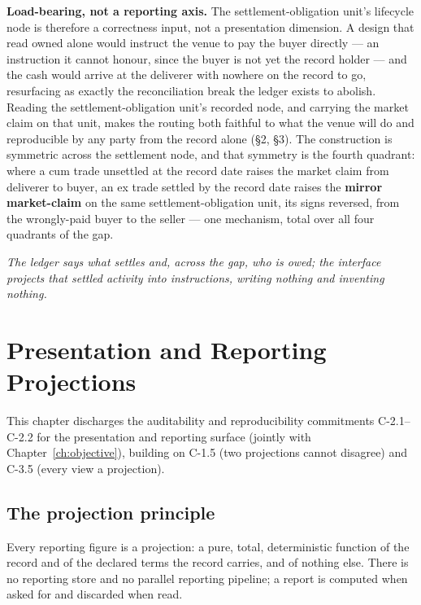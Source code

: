 \documentclass[11pt,a4paper]{article}
\begin{document}
\medskip\noindent\textbf{Load-bearing, not a reporting axis.} The settlement-obligation
unit's lifecycle node is therefore a correctness input, not a presentation dimension. A
design that read owned alone would instruct the venue to pay the buyer directly --- an
instruction it cannot honour, since the buyer is not yet the record holder --- and the
cash would arrive at the deliverer with nowhere on the record to go, resurfacing as
exactly the reconciliation break the ledger exists to abolish. Reading the
settlement-obligation unit's recorded node, and carrying the market claim on that unit,
makes the routing both faithful to what the venue will do and reproducible by any party
from the record alone (\S2, \S3). The construction is symmetric across the settlement
node, and that symmetry is the fourth quadrant: where a cum trade unsettled at the record
date raises the market claim from deliverer to buyer, an ex trade settled by the record
date raises the \textbf{mirror market-claim} on the same settlement-obligation unit, its
signs reversed, from the wrongly-paid buyer to the seller --- one mechanism, total over
all four quadrants of the gap.

\emph{The ledger says what settles and, across the gap, who is owed; the interface
projects that settled activity into instructions, writing nothing and inventing
nothing.}

\section{Presentation and Reporting Projections}\label{ch:reporting}

This chapter discharges the auditability and reproducibility commitments C-2.1--C-2.2 for the presentation and reporting surface (jointly with Chapter~\ref{ch:objective}), building on C-1.5 (two projections cannot disagree) and C-3.5 (every view a projection).

\subsection{The projection principle}

Every reporting figure is a projection: a pure, total, deterministic function of
the record and of the declared terms the record carries, and of nothing else.
There is no reporting store and no parallel reporting pipeline; a report is
computed when asked for and discarded when read.
\end{document}

